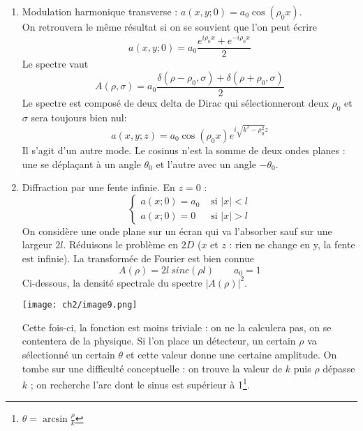 \begin{enumerate}
\item Modulation harmonique transverse : $a(x,y;0) = a_0\cos(\rho_0x)$.\\
On retrouvera le même résultat si on se souvient que l'on peut écrire
\begin{equation}
a(x,y;0) = a_0\frac{e^{i\rho_0x}+e^{-i\rho_0x}}{2}
\end{equation}
Le spectre vaut
\begin{equation}
A(\rho,\sigma) = a_0\frac{\delta(\rho-\rho_0,\sigma)+\delta(\rho+\rho_0,\sigma)}{2}
\end{equation}
Le spectre est composé de deux delta de Dirac qui sélectionneront deux $\rho_0$ et 
$\sigma$ sera toujours bien nul:
\begin{equation}
a(x,y;z) = a_0\cos(\rho_0x)e^{i\sqrt{k^2-\rho_0^2}z}
\end{equation}
Il s'agit d'un autre mode. Le cosinus n'est la somme de deux ondes planes : une se 
déplaçant à un angle $\theta_0$ et l'autre avec un angle $-\theta_0$.

\item Diffraction par une fente infinie. En $z=0$ :
\begin{equation}
\left\{\begin{array}{ll}
a(x;0) = a_0 & \text{ si } |x| < l\\
a(x;0) = 0 & \text{ si } |x| > l
\end{array}\right.
\end{equation}
On considère une onde plane sur un écran qui va l'absorber sauf sur une largeur $2l$. 
Réduisons le problème en $2D$ ($x$ et $z$ : rien ne change en y, la fente est infinie).  
La transformée de Fourier est bien connue
\begin{equation}
A(\rho) = 2l\ sinc(\rho l)\qquad a_0=1
\end{equation}
Ci-dessous, la densité spectrale du spectre $|A(\rho)|^2$. 
\begin{center}
\texttt{[image: ch2/image9.png]}
\end{center}
Cette fois-ci, la fonction est 
moins triviale : on ne la calculera pas, on se contentera de la physique. Si l'on place un 
détecteur, un certain $\rho$ va sélectionné un certain $\theta$ et cette valeur donne une 
certaine amplitude. On tombe sur une difficulté conceptuelle : on trouve la valeur de $k$ 
puis $\rho$ dépasse $k$ ; on recherche l'arc dont le sinus est supérieur à 1\footnote{$\theta =
\arcsin\frac{\rho}{k}$}.\\


\end{enumerate}
